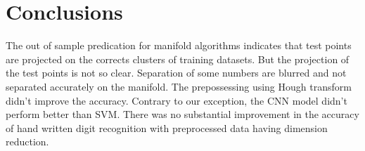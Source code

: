 \section{Conclusions}
\label{C4:con}
The out of sample predication for manifold algorithms indicates that test points are projected on the corrects clusters of training datasets. But the projection of the test points is not so clear. Separation of some numbers are blurred and not separated accurately on the manifold. The prepossessing using Hough transform didn't improve the accuracy. Contrary to our exception, the CNN model didn't perform better than SVM. There was no substantial improvement in the accuracy of hand written digit recognition with preprocessed data having dimension reduction.

